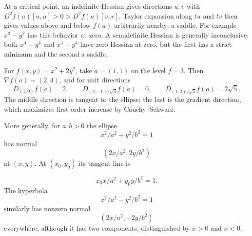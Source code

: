 \begin{remark}
At a critical point, an indefinite Hessian gives directions $u,v$ with
$D^2f(a)[u,u]>0>D^2f(a)[v,v]$. Taylor expansion along $tu$ and $tv$
then gives values above and below $f(a)$ arbitrarily nearby: a saddle.
For example $x^2-y^2$ has this behavior at zero. A semidefinite Hessian
is generally inconclusive: both $x^4+y^4$ and $x^4-y^4$ have zero Hessian
at zero, but the first has a strict minimum and the second a saddle.
\end{remark}


\begin{example}
For $f(x,y)=x^2+2y^2$, take $a=(1,1)$ on the level $f=3$.
Then $\nabla f(a)=(2,4)$, and for unit directions
\[
D_{(1,0)}f(a)=2,\qquad
D_{(2,-1)/\sqrt5}f(a)=0,\qquad
D_{(1,2)/\sqrt5}f(a)=2\sqrt5.
\]
The middle direction is tangent to the ellipse; the last is the gradient
direction, which maximizes first-order increase by Cauchy--Schwarz.
\begin{center}
\end{center}
More generally, for $a,b>0$ the ellipse
\[
x^2/a^2+y^2/b^2=1
\]
 has
normal
\[
(2x/a^2,2y/b^2)
\]
 at $(x,y)$. At $(x_0,y_0)$ its tangent line is

\[
x_0x/a^2+y_0y/b^2=1.
\]
 The hyperbola
\[
x^2/a^2-y^2/b^2=1
\]
 similarly
has nonzero normal
\[
(2x/a^2,-2y/b^2)
\]
 everywhere, although it has two
components, distinguished by $x>0$ and $x<0$.
\end{example}

